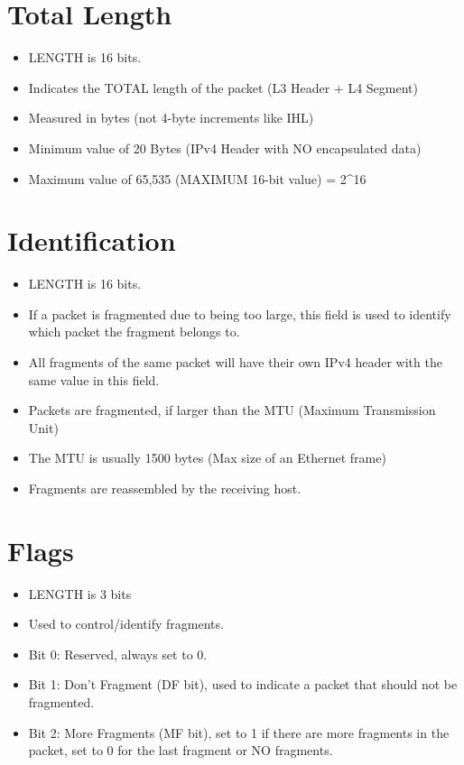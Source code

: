 \section{Total Length}\label{total-length}

\begin{itemize}
\tightlist
\item
  LENGTH is 16 bits.
\item
  Indicates the TOTAL length of the packet (L3 Header + L4 Segment)
\item
  Measured in bytes (not 4-byte increments like IHL)
\item
  Minimum value of 20 Bytes (IPv4 Header with NO encapsulated data)
\item
  Maximum value of 65,535 (MAXIMUM 16-bit value) = 2\^{}16
\end{itemize}

\section{Identification}\label{identification}

\begin{itemize}
\tightlist
\item
  LENGTH is 16 bits.
\item
  If a packet is fragmented due to being too large, this field is used
  to identify which packet the fragment belongs to.
\item
  All fragments of the same packet will have their own IPv4 header with
  the same value in this field.
\item
  Packets are fragmented, if larger than the MTU (Maximum Transmission
  Unit)
\item
  The MTU is usually 1500 bytes (Max size of an Ethernet frame)
\item
  Fragments are reassembled by the receiving host.
\end{itemize}

\section{Flags}\label{flags}

\begin{itemize}
\tightlist
\item
  LENGTH is 3 bits
\item
  Used to control/identify fragments.
\item
  Bit 0: Reserved, always set to 0.
\item
  Bit 1: Don't Fragment (DF bit), used to indicate a packet that should
  not be fragmented.
\item
  Bit 2: More Fragments (MF bit), set to 1 if there are more fragments
  in the packet, set to 0 for the last fragment or NO fragments.
\end{itemize}

